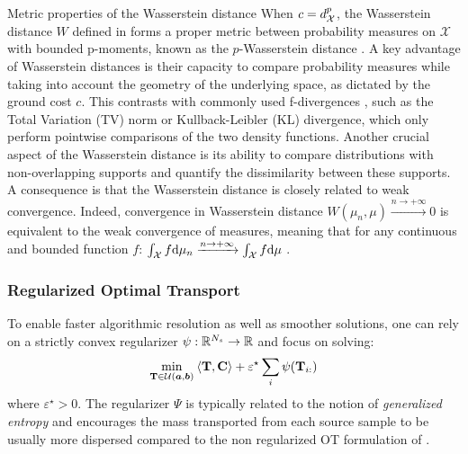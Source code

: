 \begin{mem1}{Metric properties of the Wasserstein distance}
    When \( c = d_{{\mathcal{X}}}^p \), the Wasserstein distance \( W \) defined in  forms a proper metric between probability measures on \( \mathcal{X} \) with bounded p-moments, known as the \( p \)-Wasserstein distance \citep{villani2009optimal}. A key advantage of Wasserstein distances is their capacity to compare probability measures while taking into account the geometry of the underlying space, as dictated by the ground cost \( c \). This contrasts with commonly used f-divergences \citep{csiszar1967information}, such as the Total Variation (TV) norm or Kullback-Leibler (KL) divergence, which only perform pointwise comparisons of the two density functions. Another crucial aspect of the Wasserstein distance is its ability to compare distributions with non-overlapping supports and quantify the dissimilarity between these supports. A consequence is that the Wasserstein distance is closely related to weak convergence. Indeed, convergence in Wasserstein distance \( W(\mu_n,\mu) \xrightarrow{n \to +\infty} 0 \) is equivalent to the weak convergence of measures, meaning that for any continuous and bounded function $f$: $\int_{{\mathcal{X}}} f \mathrm{d}\mu_n \xrightarrow{n \to +\infty} \int_{{\mathcal{X}}} f \mathrm{d}\mu$ \citep{villani2009optimal}.
\end{mem1}


\subsubsection{Regularized Optimal Transport}

To enable faster algorithmic resolution as well as smoother solutions, one can rely on a strictly convex regularizer $\psi : \mathbb{R}^{N_s} \to \mathbb{R}$ and focus on solving: 
\begin{align}
    \min_{{\mathbf{T}} \in {\mathcal{U}}(\bm{a}, \bm{b})} \: \langle {\mathbf{T}}, \mathbf{C} \rangle + \varepsilon^\star \sum_i \psi({\mathbf{T}}_{i:})
\end{align} 
where $\varepsilon^\star > 0$. The regularizer $\Psi$ is typically related to the notion of \emph{generalized entropy} \citep{blondel2020learning} and encourages the mass transported from each source sample to be usually more dispersed compared to the non regularized OT formulation of .

